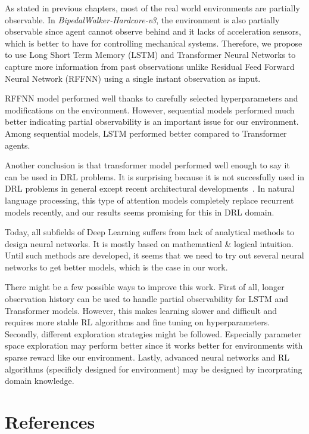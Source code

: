 \documentclass[a4paper, 12pt]{article} %
\begin{document}
As stated in previous chapters, most of the real world environments are partially observable. 
In \textit{BipedalWalker-Hardcore-v3}, the environment is also partially observable since agent cannot observe behind and it lacks of acceleration sensors, which is better to have for controlling mechanical systems. 
Therefore, we propose to use Long Short Term Memory (LSTM) and Transformer Neural Networks to capture more information from past observations unlike Residual Feed Forward Neural Network (RFFNN) using a single instant observation as input. 

RFFNN model performed well thanks to carefully selected hyperparameters and modifications on the environment. 
However, sequential models performed much better indicating partial observability is an important issue for our environment. 
Among sequential models, LSTM performed better compared to Transformer agents. 

Another conclusion is that transformer model performed well enough to say it can be used in DRL problems. 
It is surprising because it is not succesfully used in DRL problems in general except recent architectural developments~\cite{parisotto_stabilizing_2019}. 
In natural language processing, this type of attention models completely replace recurrent models recently, and our results seems promising for this in DRL domain. 

Today, all subfields of Deep Learning suffers from lack of analytical methods to design neural networks. 
It is mostly based on mathematical \& logical intuition. 
Until such methods are developed, it seems that we need to try out several neural networks to get better models, which is the case in our work. 

There might be a few possible ways to improve this work. 
First of all, longer observation history can be used to handle partial observability for LSTM and Transformer models. 
However, this makes learning slower and difficult and requires more stable RL algorithms and fine tuning on hyperparameters. 
Secondly, different exploration strategies might be followed. 
Especially parameter space exploration \cite{plappert_parameter_2018} may perform better since it works better for environments with sparse reward like our environment. 
Lastly, advanced neural networks and RL algorithms (specificly designed for environment) may be designed by incorprating domain knowledge. 

\section{References}
\end{document}
